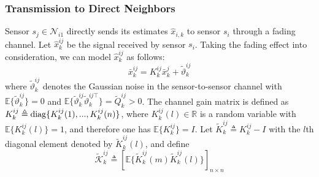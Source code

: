 \documentclass[twocolumn]{IEEEtran}
\newcommand{\diag}{{\rm diag}}
\begin{document}
\subsubsection{Transmission to Direct Neighbors}
Sensor $s_j\in \mathcal{N}_{i1}$ directly sends its estimates $\hat{x}_{i,k}$ to sensor $s_i$ through a fading channel. Let $\hat{x}_{k}^{ij}$ be the signal received by sensor $s_i$. Taking the fading effect into consideration, we can model $\hat{x}_{k}^{ij}$ as follows:
\begin{equation} \label{xij}
\bar{x}_{k}^{ij}=K_{k}^{ij}\bar{x}_{k}^{j}+\tilde{\vartheta}_{k}^{ij}
\end{equation}
where $\tilde{\vartheta}_{k}^{ij}$ denotes the Gaussian noise in the sensor-to-sensor channel with $\mathbb{E}\{\tilde{\vartheta}_{k}^{ij}\}=0$ and $\mathbb{E}\{\tilde{\vartheta}_{k}^{ij}\tilde{\vartheta}_{k}^{ij\top}\}=\tilde{Q}_{k}^{ij}>0$. The channel gain matrix is defined as $K_{k}^{ij}\triangleq \diag\{K_{k}^{ij}(1),...,K_{k}^{ij}(n)\}$, where $K_{k}^{ij}(l)\in \mathbb{R}$ is a random variable with $\mathbb{E}\{K_{k}^{ij}(l)\}= 1$, and therefore one has $\mathbb{E}\{K_{k}^{ij}\}= I$.
Let $\tilde{K}_{k}^{ij}\triangleq K_{k}^{ij}-I$ with the $l$th diagonal element denoted by $\tilde{K}_{k}^{ij}(l)$, and define
\begin{equation}
\tilde{\mathscr{K}}_{k}^{ij}\triangleq\left[\mathbb{E}\{\tilde{K}_{k}^{ij}(m)\tilde{K}_{k}^{ij}(l)\}\right]_{n\times n}
\end{equation}
\end{document}
